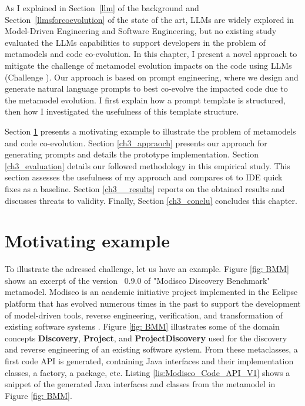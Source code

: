 As I explained in Section~\ref{llm} of the background and Section~\ref{llmsforcoevolution} of the state of the art, LLMs are widely explored in Model-Driven Engineering and Software Engineering, but no existing study evaluated the LLMs capabilities 
to support developers in the problem of metamodels and code co-evolution. 
In this chapter, I present a novel approach to mitigate the challenge of metamodel evolution impacts on the code using LLMs (Challenge ). 
Our approach is based on prompt engineering, where we design and generate natural language prompts to best co-evolve the impacted code due to the metamodel evolution. I first explain how a prompt template is structured, then how I investigated the usefulness of this template structure. 

  Section \ref{ch3_example} presents a motivating example to illustrate the problem of metamodels and code co-evolution. Section \ref{ch3_appraoch} presents our approach for generating prompts and details the prototype implementation.  Section \ref{ch3_evaluation} details our followed methodology in this empirical study. This section assesses the usefulness of my approach and compares ot to IDE quick fixes as a baseline. Section \ref{ch3__results} reports on the obtained results and discusses threats to validity. Finally, Section \ref{ch3_conclu} concludes this chapter. 

\section{Motivating example}
\label{ch3_example}


To illustrate the adressed challenge, let us have an example. 
Figure \ref{fig: BMM} shows an excerpt of the  version ~0.9.0 of "Modisco Discovery Benchmark" metamodel. %
Modisco is an academic initiative project implemented in the Eclipse platform that has evolved numerous times in the past to support the development of model-driven tools, reverse engineering, verification, and transformation of existing software systems \cite{bruneliere2010modisco,bruneliere2014modisco}.
Figure \ref{fig: BMM} illustrates  some of the domain concepts \textbf{Discovery}, \textbf{Project}, and \textbf{ProjectDiscovery}  used for the discovery and reverse engineering of an existing software system. 
From these metaclasses, a first code API is generated, containing Java interfaces and their implementation classes, a factory, a package, etc. %
Listing \ref{lis:Modisco_Code_API_V1} shows a snippet of the generated Java interfaces and classes from the metamodel in Figure \ref{fig: BMM}. 

